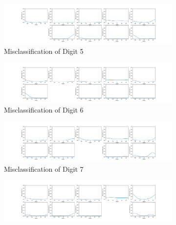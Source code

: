 \clearpage
\begin{figure}[htb!]
    \centering
    \begin{subfigure}[b]{\textwidth}
        \centering
        \includegraphics[width=\textwidth]{chapters/results/CNN/Rotate/acc6.png}
        \caption{Misclassification of Digit 5}
        \label{fig:Rotate-misclass0}
    \end{subfigure}
    \begin{subfigure}[b]{\textwidth}
        \centering
        \includegraphics[width=\textwidth]{chapters/results/CNN/Rotate/acc7.png}
        \caption{Misclassification of Digit 6}
        \label{fig:Rotate-misclass0}
    \end{subfigure}
    \begin{subfigure}[b]{\textwidth}
        \centering
        \includegraphics[width=\textwidth]{chapters/results/CNN/Rotate/acc8.png}
        \caption{Misclassification of Digit 7}
        \label{fig:Rotate-misclass0}
    \end{subfigure}
    \begin{subfigure}[b]{\textwidth}
        \centering
        \includegraphics[width=\textwidth]{chapters/results/CNN/Rotate/acc9.png}

\end{subfigure}
\end{figure}
